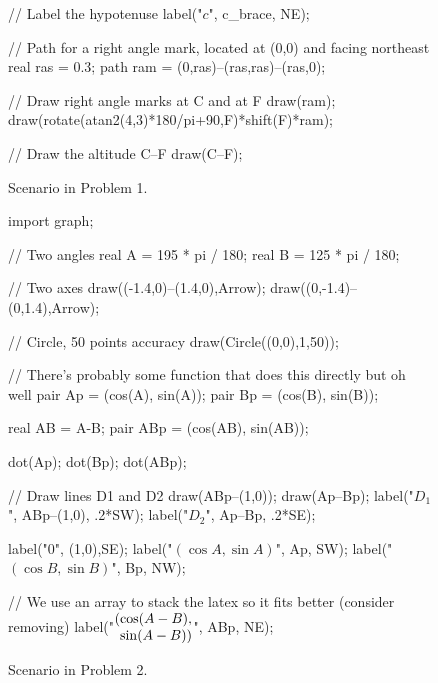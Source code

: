 \documentclass[../textbook.tex]{subfiles}
\begin{document}
\begin{figure}[h]
\begin{center}
\begin{minipage}[b]{0.45\textwidth}
\begin{asy}[width=0.7\textwidth]
				// Label the hypotenuse
				label("$c$", c_brace, NE);

				// Path for a right angle mark, located at (0,0) and facing northeast
				real ras = 0.3;
				path ram = (0,ras)--(ras,ras)--(ras,0);

				// Draw right angle marks at C and at F
				draw(ram);
				draw(rotate(atan2(4,3)*180/pi+90,F)*shift(F)*ram);

				// Draw the altitude C--F
				draw(C--F);
			\end{asy}
		\end{minipage}
	\end{center}
	\vspace*{-2\baselineskip}
	\begin{center}
		\begin{minipage}[t]{0.45\textwidth}
			\caption{Scenario in Problem 1.}
			\label{fig:square_inscribed}
		\end{minipage}
		\hfill
		\begin{minipage}[t]{0.45\textwidth}
			\caption{Scenario in Problem 2.}
			\label{fig:pythag_sim_tri}
		\end{minipage}
	\end{center}

	\begin{center}
		\begin{minipage}[b]{\textwidth}
			\centering
			\begin{asy}[width=0.5\textwidth]
				import graph;

				// Two angles
				real A = 195 * pi / 180;
				real B = 125 * pi / 180;

				// Two axes
				draw((-1.4,0)--(1.4,0),Arrow);
				draw((0,-1.4)--(0,1.4),Arrow);

				// Circle, 50 points accuracy
				draw(Circle((0,0),1,50));

				// There's probably some function that does this directly but oh well
				pair Ap = (cos(A), sin(A));
				pair Bp = (cos(B), sin(B));

				real AB = A-B;
				pair ABp = (cos(AB), sin(AB));

				dot(Ap);
				dot(Bp);
				dot(ABp);

				// Draw lines D1 and D2
				draw(ABp--(1,0));
				draw(Ap--Bp);
				label("$D_1$", ABp--(1,0), .2*SW);
			  label("$D_2$", Ap--Bp, .2*SE);

				label("$0$", (1,0),SE);
				label("$(\cos A, \sin A)$", Ap, SW);
				label("$(\cos B, \sin B)$", Bp, NW);

				// We use an array to stack the latex so it fits better (consider removing)
				label("$\arraycolsep=0pt \begin{array}{rl} (& \cos (A-B), \\ & \sin (A-B)) \end{array}$", ABp, NE);


\end{asy}
\end{minipage}
\end{center}
\end{figure}
\end{document}
